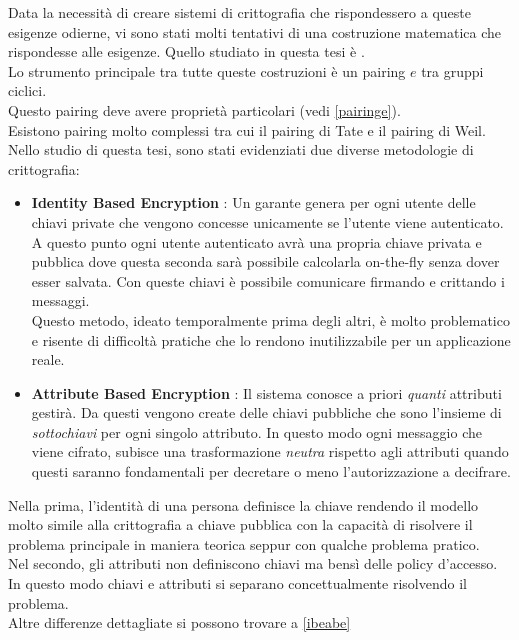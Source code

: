 Data la necessità di creare sistemi di crittografia che rispondessero a queste esigenze odierne, vi sono stati molti tentativi di una costruzione matematica che rispondesse alle esigenze. Quello studiato in questa tesi è \cite{kpabe}.\\
Lo strumento principale tra tutte queste costruzioni è un pairing $e$ tra gruppi ciclici.\\
Questo pairing deve avere proprietà particolari (vedi \ref{pairinge}).\\
Esistono pairing molto complessi \cite{maas} \cite{benoit} tra cui il pairing di Tate e il pairing di Weil.\\[0.2cm]
Nello studio di questa tesi, sono stati evidenziati due diverse metodologie di crittografia:
\begin{itemize}
	\item \textbf{Identity Based Encryption} : Un garante genera per ogni utente delle chiavi private che vengono concesse unicamente se l'utente viene autenticato. A questo punto ogni utente autenticato avrà una propria chiave privata e pubblica dove questa seconda sarà possibile calcolarla on-the-fly senza dover esser salvata. Con queste chiavi è possibile comunicare firmando e crittando i messaggi.\\
	Questo metodo, ideato temporalmente prima degli altri, è molto problematico e risente di difficoltà pratiche che lo rendono inutilizzabile per un applicazione reale.
	\item \textbf{Attribute Based Encryption} : Il sistema conosce a priori \emph{quanti} attributi gestirà. Da questi vengono create delle chiavi pubbliche che sono l'insieme di \emph{sottochiavi} per ogni singolo attributo. In questo modo ogni messaggio che viene cifrato, subisce una trasformazione \emph{neutra} rispetto agli attributi quando questi saranno fondamentali per decretare o meno l'autorizzazione a decifrare.
\end{itemize}

Nella prima, l'identità di una persona definisce la chiave rendendo il modello molto simile alla crittografia a chiave pubblica con la capacità di risolvere il problema principale in maniera teorica seppur con qualche problema pratico.\\
Nel secondo, gli attributi non definiscono chiavi ma bensì delle policy d'accesso. In questo modo chiavi e attributi si separano concettualmente risolvendo il problema.\\
Altre differenze dettagliate si possono trovare a \ref{ibeabe}\\[0.2cm]


